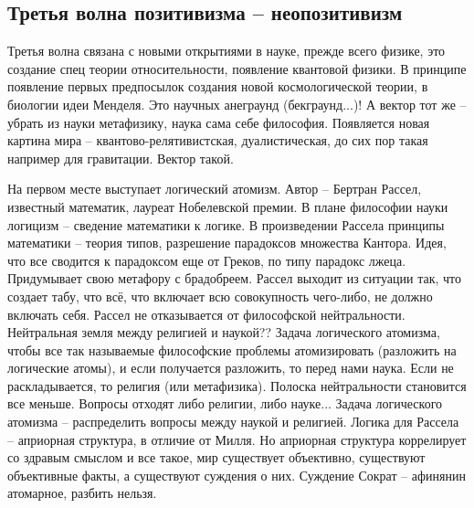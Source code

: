 \documentclass[a4paper, 12pt]{article}
\begin{document}

\subsection{Третья волна позитивизма -- неопозитивизм}

Третья волна связана с новыми открытиями в науке, прежде всего физике, 
это создание спец теории относительности, появление квантовой физики. 
В принципе появление первых предпосылок создания новой космологической 
теории, в биологии идеи Менделя. Это научных анеграунд (бекграунд...)! 
А вектор тот же -- убрать из науки метафизику, наука сама себе 
философия. Появляется новая картина мира -- квантово-релятивистская, 
дуалистическая, до сих пор такая например для гравитации. Вектор такой.

На первом месте выступает логический атомизм. Автор -- Бертран Рассел, 
известный математик, лауреат Нобелевской премии. В плане философии науки 
логицизм -- сведение математики к логике. В произведении Рассела 
принципы математики -- теория типов, разрешение парадоксов множества 
Кантора. Идея, что все сводится к парадоксом еще от Греков, по типу 
парадокс лжеца. Придумывает свою метафору с брадобреем. Рассел выходит 
из ситуации так, что создает табу, что всё, что включает всю 
совокупность чего-либо, не должно включать себя. Рассел не отказывается 
от философской нейтральности. Нейтральная земля между религией 
и наукой?? Задача логического атомизма, чтобы все так называемые 
философские проблемы атомизировать (разложить на логические атомы), 
и если получается разложить, то перед нами наука. Если не 
раскладывается, то религия (или метафизика). Полоска нейтральности 
становится все меньше. Вопросы отходят либо религии, либо науке... 
Задача логического атомизма -- распределить вопросы между наукой 
и религией. Логика для Рассела -- априорная структура, в отличие от 
Милля. Но априорная структура коррелирует со здравым смыслом и все 
такое, мир существует объективно, существуют объективные факты, 
а существуют суждения о них. Суждение Сократ -- афинянин атомарное, 
разбить нельзя.
\end{document}

